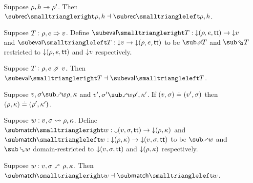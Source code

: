 \begin{theorem}
\label{thm:core-language:closeDefs:gc}
   Suppose $\rho, h \twoheadrightarrow \rho'$.  Then $\closeDefsFwdF{\rho,h} \adjoint \closeDefsBwdF{\rho,h}$.
\end{theorem}

\begin{definition}
   Suppose $T: \rho, e \Rightarrow v$. Define $\evalFwdF{T}: \Below{(\rho, e, \TT)} \to \Below{v}$ and $\evalBwdF{T}: \Below{v} \to \Below{(\rho, e, \TT)}$ to be $\evalFwdR{T}$ and $\evalBwdR{T}$ restricted to ${\downarrow}{(\rho, e, \mathsf{tt})}$ and ${\downarrow}{v}$ respectively.
\end{definition}

\begin{theorem}
\label{thm:core-language:eval:gc}
   Suppose $T: \rho, e \evalFwdS v$.  Then $\evalFwdF{T} \adjoint \evalBwdF{T}$.
\end{theorem}

\begin{lemma}
   Suppose $v, \sigma \matchFwdR{w} \rho, \kappa$ and $v', \sigma' \matchFwdR{w} \rho', \kappa'$. If $(v, \sigma) \doteq (v', \sigma)$ then $(\rho, \kappa) \doteq (\rho', \kappa')$.
\end{lemma}

\begin{definition}
   Suppose $w: v, \sigma \rightsquigarrow \rho, \kappa$. Define $\matchFwdF{w}: \Below{(v,\sigma,\TT)} \to \Below{(\rho,\kappa)}$ and $\matchBwdF{w}: \Below{(\rho,\kappa)} \to \Below{(v,\sigma,\TT)}$ to be $\matchFwdR{w}$ and $\matchBwdR{w}$ domain-restricted to ${\downarrow}{(v,\sigma,\mathsf{tt})}$ and ${\downarrow}{(\rho,\kappa)}$ respectively.
\end{definition}

\begin{theorem}
\label{thm:core-language:match:gc}
   Suppose $w: v, \sigma \matchFwdS \rho, \kappa$.  Then $\matchFwdF{w} \adjoint \matchBwdF{w}$.
\end{theorem}
